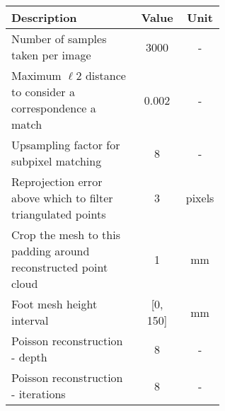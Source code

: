 
\begin{tabular}{Q{0.6\linewidth}cc}
    \toprule
    Description & Value & Unit \\\midrule
    Number of samples taken per image & 3000 & - \\
    Maximum $\ell 2$ distance to consider a correspondence a match & 0.002 & - \\
    Upsampling factor for subpixel matching & 8 & - \\
    Reprojection error above which to filter triangulated points&  3 & pixels \\
    Crop the mesh to this padding around reconstructed point cloud & 1 & mm \\
    Foot mesh height interval & [0, 150] & mm \\
    Poisson reconstruction - depth & 8 & - \\
    Poisson reconstruction - iterations & 8 & - \\
    \bottomrule
\end{tabular}